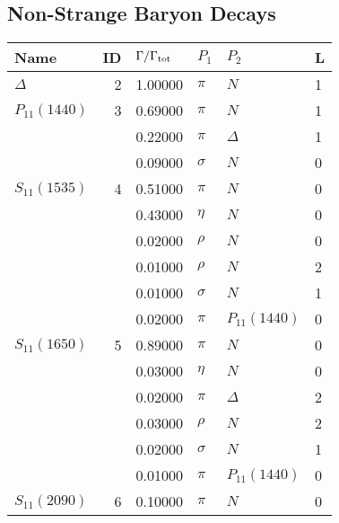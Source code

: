 \documentclass[a4paper,10pt]{article}
\begin{document}
\subsection{Non-Strange Baryon Decays}
\begin{tabular}[t]{lrllll} 
\toprule
Name & ID & $\Gamma/\Gamma_{\rm tot}$ & $P_1$ & $P_2$ & L \\ 
\midrule
$      \Delta        $&  2& 1.00000&$ \pi                 $ &$ N                   $& 1\\
\midrule
$      P_{11}(1440)  $&  3& 0.69000&$ \pi                 $ &$ N                   $& 1\\
$                    $&   & 0.22000&$ \pi                 $ &$ \Delta              $& 1\\
$                    $&   & 0.09000&$ \sigma              $ &$ N                   $& 0\\
\midrule
$      S_{11}(1535)  $&  4& 0.51000&$ \pi                 $ &$ N                   $& 0\\
$                    $&   & 0.43000&$ \eta                $ &$ N                   $& 0\\
$                    $&   & 0.02000&$ \rho                $ &$ N                   $& 0\\
$                    $&   & 0.01000&$ \rho                $ &$ N                   $& 2\\
$                    $&   & 0.01000&$ \sigma              $ &$ N                   $& 1\\
$                    $&   & 0.02000&$ \pi                 $ &$ P_{11}(1440)        $& 0\\
\midrule
$      S_{11}(1650)  $&  5& 0.89000&$ \pi                 $ &$ N                   $& 0\\
$                    $&   & 0.03000&$ \eta                $ &$ N                   $& 0\\
$                    $&   & 0.02000&$ \pi                 $ &$ \Delta              $& 2\\
$                    $&   & 0.03000&$ \rho                $ &$ N                   $& 2\\
$                    $&   & 0.02000&$ \sigma              $ &$ N                   $& 1\\
$                    $&   & 0.01000&$ \pi                 $ &$ P_{11}(1440)        $& 0\\
\midrule
$      S_{11}(2090)  $&  6& 0.10000&$ \pi                 $ &$ N                   $& 0\\

\end{tabular}
\end{document}
